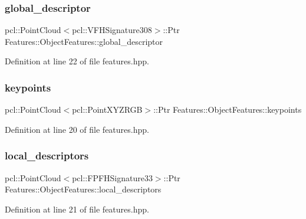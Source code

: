 \subsubsection{\texorpdfstring{global\+\_\+descriptor}{global\_descriptor}}
{\footnotesize\ttfamily pcl\+::\+Point\+Cloud$<$pcl\+::\+V\+F\+H\+Signature308$>$\+::Ptr Features\+::\+Object\+Features\+::global\+\_\+descriptor}



Definition at line 22 of file features.\+hpp.

\hypertarget{struct_features_1_1_object_features_a1d79b5b8a3ed32e75e3bb31bf90e1f27}{}\label{struct_features_1_1_object_features_a1d79b5b8a3ed32e75e3bb31bf90e1f27} 
\subsubsection{\texorpdfstring{keypoints}{keypoints}}
{\footnotesize\ttfamily pcl\+::\+Point\+Cloud$<$pcl\+::\+Point\+X\+Y\+Z\+R\+GB$>$\+::Ptr Features\+::\+Object\+Features\+::keypoints}



Definition at line 20 of file features.\+hpp.

\hypertarget{struct_features_1_1_object_features_a6a0716472128159b45153c96404ad8c4}{}\label{struct_features_1_1_object_features_a6a0716472128159b45153c96404ad8c4} 
\subsubsection{\texorpdfstring{local\+\_\+descriptors}{local\_descriptors}}
{\footnotesize\ttfamily pcl\+::\+Point\+Cloud$<$pcl\+::\+F\+P\+F\+H\+Signature33$>$\+::Ptr Features\+::\+Object\+Features\+::local\+\_\+descriptors}



Definition at line 21 of file features.\+hpp.

\hypertarget{struct_features_1_1_object_features_ad0d958cfd324196e673ace91e4f57a94}{}\label{struct_features_1_1_object_features_ad0d958cfd324196e673ace91e4f57a94} 

